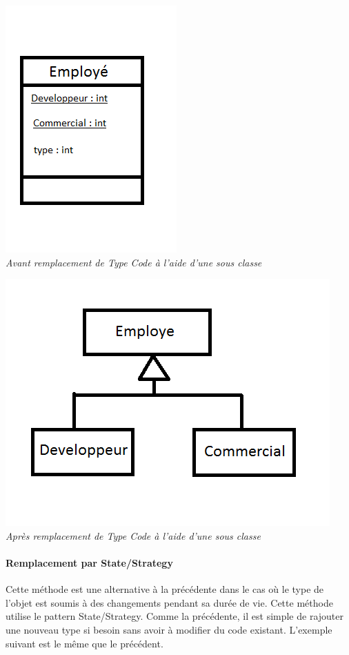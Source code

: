 \documentclass[a4paper,twoside,12pt,openright]{report}
\begin{document}
\begin{center}
\includegraphics[scale=1]{Image/TypeCode_SousClasse.png}\\
\itshape{Avant remplacement de Type Code à l'aide d'une sous classe}
\end{center}

\begin{center}
\includegraphics[scale=1]{Image/TypeCode_SousClasse2.png}\\
\itshape{Après remplacement de Type Code à l'aide d'une sous classe}
\end{center}

\paragraph{Remplacement par State/Strategy}
Cette méthode est une alternative à la précédente dans le cas où le type de l'objet est soumis à des changements pendant sa durée de vie. Cette méthode utilise le pattern State/Strategy. Comme la précédente, il est simple de rajouter une nouveau type si besoin sans avoir à modifier du code existant. L'exemple suivant est le même que le précédent.
\end{document}
